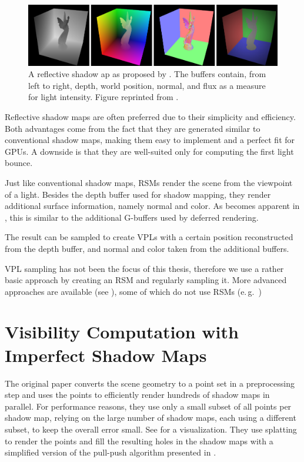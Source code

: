 \begin{figure}[htb]
\centering
    \includegraphics[width=\textwidth]{graphics/rsm_dachsbacher}
  \caption{A reflective shadow ap as proposed by \citet{Dachsbacher:2005:RSM}. The buffers contain, from left to right, depth, world position, normal, and flux as a measure for light intensity. Figure reprinted from \citet{Dachsbacher:2005:RSM}.}
  \label{fig:concept:rsm_dachsbacher}
\end{figure}

Reflective shadow maps are often preferred due to their simplicity and efficiency. Both advantages come from the fact that they are generated similar to conventional shadow maps, making them easy to implement and a perfect fit for GPUs. A downside is that they are well-suited only for computing the first light bounce.

Just like conventional shadow maps, RSMs render the scene from the viewpoint of a light. Besides the depth buffer used for shadow mapping, they render additional surface information, namely normal and color. As becomes apparent in , this is similar to the additional G-buffers used by deferred rendering.

The result can be sampled to create VPLs with a certain position reconstructed from the depth buffer, and normal and color taken from the additional buffers.

VPL sampling has not been the focus of this thesis, therefore we use a rather basic approach by creating an RSM and regularly sampling it. More advanced approaches are available (see ), some of which do not use RSMs (e.\,g.\ \cite{hedman2016sequential})


\section{Visibility Computation with Imperfect Shadow Maps}
\label{sec:concept:ism}

The original paper \citep{ritschel2008ism} converts the scene geometry to a point set in a preprocessing step and uses the points to efficiently render hundreds of shadow maps in parallel. For performance reasons, they use only a small subset of all points per shadow map, relying on the large number of shadow maps, each using a different subset, to keep the overall error small. See  for a visualization. They use splatting to render the points and fill the resulting holes in the shadow maps with a simplified version of the pull-push algorithm presented in  \citep{Marroquim:2007:reconstruction}.

